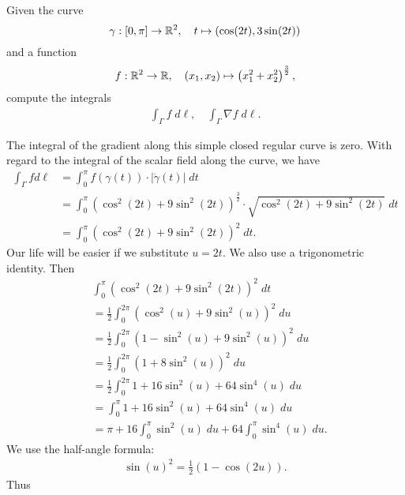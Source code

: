 \documentclass[11pt]{article}
\begin{document}
\begin{exercise}[Challenge?]
    Given the curve
    \[
        \gamma : [0,\pi] \to \mathbb{R}^2, \quad t \mapsto ( \cos(2t), 3\sin(2t) )
    \]
    and a function
    \[
        f : \mathbb{R}^2 \to \mathbb{R}, \quad (x_1,x_2) \mapsto \left( x_1^2 + x_2^2 \right)^{\frac 3 2},
    \]
    compute the integrals 
    \begin{align*}
        \int_\Gamma f \;d\ell, \quad \int_\Gamma \nabla f \;d\ell.
    \end{align*}
\end{exercise}
\begin{solution}     
    The integral of the gradient along this simple closed regular curve is zero.
    With regard to the integral of the scalar field along the curve, we have 
    \begin{align*}
       \int_\Gamma f d\ell
       &=
       \int_0^{\pi} f(\gamma(t)) \cdot |\dot\gamma(t)| \;dt
       \\&=
       \int_0^{\pi} \left( \cos^2(2t) + 9\sin^2(2t) \right)^{\frac 3 2} \cdot \sqrt{ \cos^2(2t) + 9\sin^2(2t) } \;dt
       \\&=
       \int_0^{\pi} \left( \cos^2(2t) + 9 \sin^2(2t) \right)^{2} \;dt
       .
    \end{align*}
    Our life will be easier if we substitute $u = 2t$. We also use a trigonometric identity. Then
    \begin{align*}
        &
        \int_0^{\pi} \left( \cos^2(2t) + 9 \sin^2(2t) \right)^{2} \;dt
        \\&=
        \frac {1} 2 \int_0^{2\pi} \left( \cos^2(u) + 9 \sin^2(u) \right)^{2} \;du
        \\&=
        \frac {1} 2 \int_0^{2\pi} \left( 1 - \sin^2(u) + 9 \sin^2(u) \right)^{2} \;du
        \\&=
        \frac {1} 2 \int_0^{2\pi} \left( 1 + 8 \sin^2(u) \right)^{2} \;du
        \\&=
        \frac {1} 2 \int_0^{2\pi} 1 + 16 \sin^2(u) + 64 \sin^4(u) \;du
        \\&=
        \int_0^{\pi} 1 + 16 \sin^2(u) + 64 \sin^4(u) \;du
        \\&=
        \pi + 16 \int_0^{\pi} \sin^2(u) \;du + 64 \int_0^{\pi} \sin^4(u) \;du
        .
    \end{align*}
    We use the half-angle formula:
    \begin{align*}
        \sin(u)^2 = \frac 1 2 \left( 1 - \cos(2u) \right).
    \end{align*}
    Thus
    \begin{align*}

\end{align*}
\end{solution}
\end{document}

